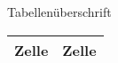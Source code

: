 \documentclass{scrartcl}
\begin{document}
\begin{table}
  \begin{captionbeside}{Tabellen\"uberschrift}
    \begin{tabular}{ll}\hline
      Zelle & Zelle \\ \hline
    \end{tabular}
  \end{captionbeside}
\end{table}
\end{document}
